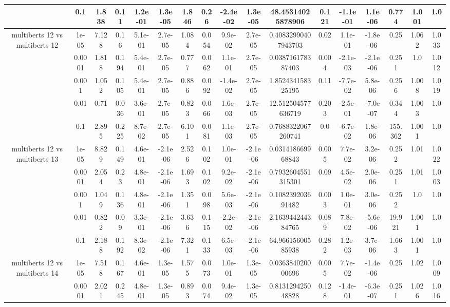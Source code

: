\begin{tabular}{|c|c|c|c|c|c|c|c|c|c|c|c|c|c|c|c|c|}
 & 0.1 & 1.838 & 0.11 & 1.2e-01 & 1.3e-05 & 1.846 & 0.26 & -2.4e-02 & 1.3e-05 & 48.45314025878906 & 0.121 & -1.1e-01 & 1.1e-06 & 0.774 & 1.001 & 1.0 \\
\hline
\multirow{5}{*}{multiberts 12 vs multiberts 12} & 1e-05 & 7.128 & 0.16 & 5.1e-01 & 2.7e-05 & 1.084 & 0.054 & 9.9e-02 & 2.7e-05 & 0.40832990407943703 & 0.02 & 1.1e-01 & -1.8e-06 & 0.25 & 1.062 & 1.033 \\
 & 0.0001 & 1.818 & 0.194 & 5.4e-01 & 2.7e-05 & 0.777 & 0.062 & 1.1e-01 & 2.7e-05 & 0.038716178387403 & 0.004 & -2.1e-03 & -2.1e-06 & 0.251 & 1.0 & 1.012 \\
 & 0.001 & 1.052 & 0.105 & 5.4e-01 & 2.7e-05 & 0.886 & 0.092 & -1.4e-02 & 2.7e-05 & 1.852434158325195 & 0.11 & -7.7e-02 & 5.8e-06 & 0.256 & 1.008 & 1.019 \\
 & 0.01 & 0.71 & 0.036 & 3.6e-01 & 2.7e-05 & 0.823 & 0.066 & 1.6e-03 & 2.7e-05 & 12.512504577636719 & 0.203 & -2.5e-01 & -7.0e-07 & 0.344 & 1.003 & 1.0 \\
 & 0.1 & 2.895 & 0.225 & 8.7e-02 & 2.7e-05 & 6.101 & 0.081 & 1.1e-03 & 2.7e-05 & 0.7688322067260741 & 0.0 & -6.7e-02 & 1.8e-06 & 155.362 & 1.001 & 1.0 \\
\hline
\multirow{5}{*}{multiberts 12 vs multiberts 13} & 1e-05 & 8.829 & 0.149 & 4.6e-01 & -2.1e-06 & 2.526 & 0.102 & 1.0e-01 & -2.1e-06 & 0.031418669968843 & 0.005 & 7.7e-02 & 3.2e-06 & 0.252 & 1.01 & 1.022 \\
 & 0.0001 & 2.054 & 0.23 & 4.8e-01 & -2.1e-06 & 1.693 & 0.102 & 9.2e-02 & -2.1e-06 & 0.7932604551315301 & 0.09 & 4.5e-02 & 2.0e-06 & 0.251 & 1.01 & 1.003 \\
 & 0.001 & 1.049 & 0.136 & 4.8e-01 & -2.1e-06 & 1.351 & 0.098 & 5.6e-03 & -2.1e-06 & 0.108239203691482 & 0.003 & 1.0e-01 & 3.0e-06 & 0.252 & 1.0 & 1.0 \\
 & 0.01 & 0.822 & 0.09 & 3.3e-01 & -2.1e-06 & 3.636 & 0.115 & -2.2e-02 & -2.1e-06 & 2.163944244384765 & 0.089 & 7.8e-02 & -5.6e-06 & 19.921 & 1.001 & 1.0 \\
 & 0.1 & 2.188 & 0.192 & 8.3e-02 & -2.1e-06 & 7.321 & 0.133 & 6.5e-03 & -2.1e-06 & 64.96615600585938 & 0.282 & 1.2e-03 & 3.7e-06 & 1.663 & 1.001 & 1.0 \\
\hline
\multirow{5}{*}{multiberts 12 vs multiberts 14} & 1e-05 & 7.518 & 0.167 & 4.6e-01 & 1.3e-05 & 1.575 & 0.073 & 1.0e-01 & 1.3e-05 & 0.036384020000696 & 0.005 & 7.7e-02 & -1.4e-06 & 0.25 & 1.02 & 1.009 \\
 & 0.0001 & 2.021 & 0.245 & 4.8e-01 & 1.3e-05 & 0.893 & 0.074 & 9.4e-02 & 1.3e-05 & 0.813129425048828 & 0.128 & -1.4e-01 & -6.3e-07 & 0.251 & 1.026 & 1.016 \\

\end{tabular}
